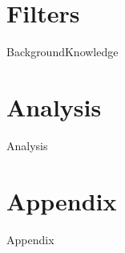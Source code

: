 \documentclass[12pt,a4paper]{article}
\begin{document}
	\tableofcontents
\section{Filters}
	{BackgroundKnowledge}
\section{Analysis}
	{Analysis}
\section{Appendix}
	{Appendix}
	
	
\end{document}
